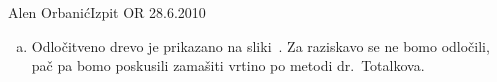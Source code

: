 \begin{naloga}{Alen Orbanić}{Izpit OR 28.6.2010}
\begin{odgovor}
\begin{enumerate}[(a)]
\item Odločitveno drevo je prikazano na sliki~\fig[bp-drevo].
Za raziskavo se ne bomo odločili,
pač pa bomo poskusili zamašiti vrtino po metodi dr.~Totalkova.
\end{enumerate}
%
\begin{slika}[p]
\pgfslika[bp-graf]
\end{slika}
%
\begin{slika}[p]
\makebox[\textwidth][c]{
\pgfslika[bp-drevo]
}
\end{slika}
\end{odgovor}
\end{naloga}
